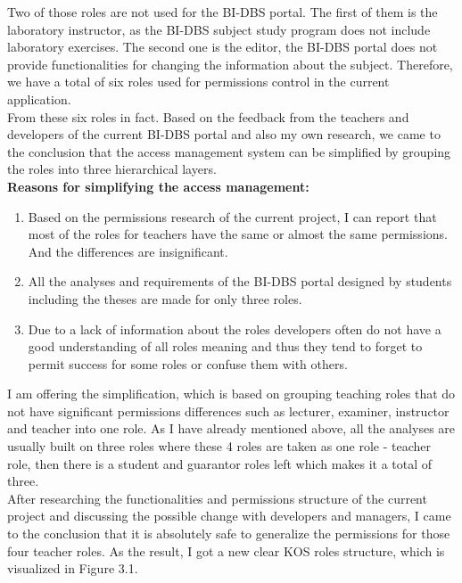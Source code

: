 \noindent Two of those roles are not used for the BI-DBS portal. The first of them is the laboratory instructor, as the BI-DBS subject study program does not include laboratory exercises. The second one is the editor, the BI-DBS portal does not provide functionalities for changing the information about the subject. Therefore, we have a total of six roles used for permissions control in the current application.\\  
From these six roles in fact. Based on the feedback from the teachers and developers of the current BI-DBS portal and also my own research, we came to the conclusion that the access management system can be simplified by grouping the roles into three hierarchical layers.\\

\noindent \textbf{Reasons for simplifying the access management:}

\begin{enumerate}
    \item Based on the permissions research of the current project, I can report that most of the roles for teachers have the same or almost the same permissions. And the differences are insignificant.
    \item All the analyses and requirements of the BI-DBS portal designed by students including the theses are made for only three roles.
    \item Due to a lack of information about the roles developers often do not have a good understanding of all roles meaning and thus they tend to forget to permit success for some roles or confuse them with others.
\end{enumerate}

\noindent I am offering the simplification, which is based on grouping teaching roles that do not have significant permissions differences such as lecturer, examiner, instructor and teacher into one role. As I have already mentioned above, all the analyses are usually built on three roles where these 4 roles are taken as one role - teacher role, then there is a student and guarantor roles left which makes it a total of three.\\
After researching the functionalities and permissions structure of the current project and discussing the possible change with developers and managers, I came to the conclusion that it is absolutely safe to generalize the permissions for those four teacher roles. As the result, I got a new clear KOS roles structure, which is visualized in Figure 3.1.


